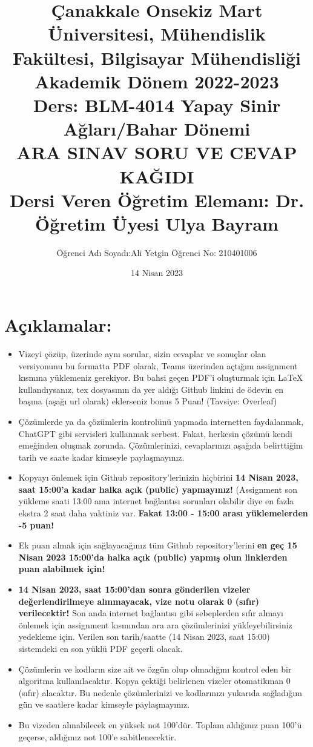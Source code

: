 \documentclass[11pt]{article}
\title{Çanakkale Onsekiz Mart Üniversitesi, Mühendislik Fakültesi, Bilgisayar Mühendisliği Akademik Dönem 2022-2023\\
Ders: BLM-4014 Yapay Sinir Ağları/Bahar Dönemi\\ 
ARA SINAV SORU VE CEVAP KAĞIDI\\
Dersi Veren Öğretim Elemanı: Dr. Öğretim Üyesi Ulya Bayram}
\author{%
\begin{minipage}{\textwidth}
\raggedright
Öğrenci Adı Soyadı:Ali Yetgin\newline
Öğrenci No: 210401006
\end{minipage}%
}
\date{14 Nisan 2023}
\begin{document}
\maketitle

\vspace{-.5in}
\section*{Açıklamalar:}
\begin{itemize}
    \item Vizeyi çözüp, üzerinde aynı sorular, sizin cevaplar ve sonuçlar olan versiyonunu bu formatta PDF olarak, Teams üzerinden açtığım assignment kısmına yüklemeniz gerekiyor. Bu bahsi geçen PDF'i oluşturmak için LaTeX kullandıysanız, tex dosyasının da yer aldığı Github linkini de ödevin en başına (aşağı url olarak) eklerseniz bonus 5 Puan! (Tavsiye: Overleaf)
    \item Çözümlerde ya da çözümlerin kontrolünü yapmada internetten faydalanmak, ChatGPT gibi servisleri kullanmak serbest. Fakat, herkesin çözümü kendi emeğinden oluşmak zorunda. Çözümlerinizi, cevaplarınızı aşağıda belirttiğim tarih ve saate kadar kimseyle paylaşmayınız. 
    \item Kopyayı önlemek için Github repository'lerinizin hiçbirini \textbf{14 Nisan 2023, saat 15:00'a kadar halka açık (public) yapmayınız!} (Assignment son yükleme saati 13:00 ama internet bağlantısı sorunları olabilir diye en fazla ekstra 2 saat daha vaktiniz var. \textbf{Fakat 13:00 - 15:00 arası yüklemelerden -5 puan!}
    \item Ek puan almak için sağlayacağınız tüm Github repository'lerini \textbf{en geç 15 Nisan 2023 15:00'da halka açık (public) yapmış olun linklerden puan alabilmek için!}
    \item \textbf{14 Nisan 2023, saat 15:00'dan sonra gönderilen vizeler değerlendirilmeye alınmayacak, vize notu olarak 0 (sıfır) verilecektir!} Son anda internet bağlantısı gibi sebeplerden sıfır almayı önlemek için assignment kısmından ara ara çözümlerinizi yükleyebilirsiniz yedekleme için. Verilen son tarih/saatte (14 Nisan 2023, saat 15:00) sistemdeki en son yüklü PDF geçerli olacak.
    \item Çözümlerin ve kodların size ait ve özgün olup olmadığını kontrol eden bir algoritma kullanılacaktır. Kopya çektiği belirlenen vizeler otomatikman 0 (sıfır) alacaktır. Bu nedenle çözümlerinizi ve kodlarınızı yukarıda sağladığım gün ve saatlere kadar kimseyle paylaşmayınız.
    \item Bu vizeden alınabilecek en yüksek not 100'dür. Toplam aldığınız puan 100'ü geçerse, aldığınız not 100'e sabitlenecektir.

\end{itemize}
\end{document}
